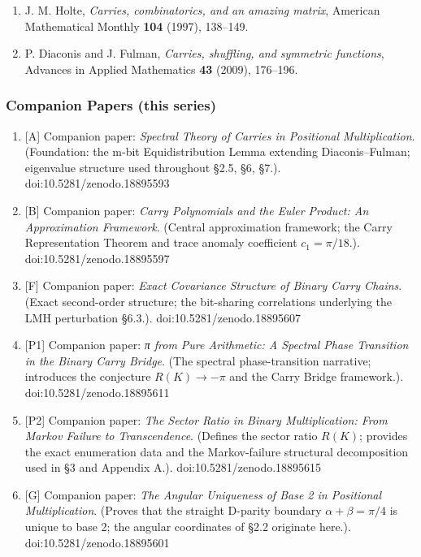 \documentclass[
  11pt,
]{article}
\providecommand{\tightlist}{%
  \setlength{\itemsep}{0pt}\setlength{\parskip}{0pt}}
\begin{document}
\begin{enumerate}
\def\labelenumi{\arabic{enumi}.}
\tightlist
\item
  J. M. Holte, \emph{Carries, combinatorics, and an amazing matrix}, American
  Mathematical Monthly \textbf{104} (1997), 138--149.
\item
  P. Diaconis and J. Fulman, \emph{Carries, shuffling, and symmetric functions},
  Advances in Applied Mathematics \textbf{43} (2009), 176--196.
\end{enumerate}

\subsubsection{Companion Papers (this
series)}\label{companion-papers-this-series}

\begin{enumerate}
\def\labelenumi{\arabic{enumi}.}
\setcounter{enumi}{2}
\tightlist
\item
  {[}A{]} Companion paper: \emph{Spectral Theory of Carries in Positional
  Multiplication}. (Foundation: the m-bit Equidistribution Lemma extending
  Diaconis--Fulman; eigenvalue structure used throughout §2.5, §6, §7.).
  doi:10.5281/zenodo.18895593
\item
  {[}B{]} Companion paper: \emph{Carry Polynomials and the Euler Product: An
  Approximation Framework}. (Central approximation framework; the Carry
  Representation Theorem and trace anomaly coefficient \(c_1 = \pi/18\).).
  doi:10.5281/zenodo.18895597
\item
  {[}F{]} Companion paper: \emph{Exact Covariance Structure of Binary Carry
  Chains}. (Exact second-order structure; the bit-sharing correlations
  underlying the LMH perturbation §6.3.). doi:10.5281/zenodo.18895607
\item
  {[}P1{]} Companion paper: \emph{π from Pure Arithmetic: A Spectral Phase
  Transition in the Binary Carry Bridge}. (The spectral phase-transition
  narrative; introduces the conjecture \(R(K) \to -\pi\) and the Carry Bridge
  framework.). doi:10.5281/zenodo.18895611
\item
  {[}P2{]} Companion paper: \emph{The Sector Ratio in Binary Multiplication:
  From Markov Failure to Transcendence}. (Defines the sector ratio \(R(K)\);
  provides the exact enumeration data and the Markov-failure structural
  decomposition used in §3 and Appendix A.). doi:10.5281/zenodo.18895615
\item
  {[}G{]} Companion paper: \emph{The Angular Uniqueness of Base 2 in Positional
  Multiplication}. (Proves that the straight D-parity boundary
  \(\alpha + \beta = \pi/4\) is unique to base 2; the angular coordinates of
  §2.2 originate here.). doi:10.5281/zenodo.18895601
\end{enumerate}
\end{document}
